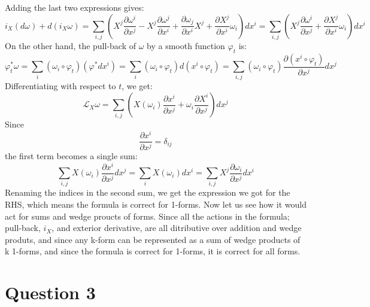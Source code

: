 \documentclass{article}
\begin{document}
Adding the last two expressions gives:
\begin{equation}
    i_X(d\omega) + d(i_X \omega) = \sum_{i,j}\left(X^j\frac{\partial \omega^i}{\partial x^j}
    - X^j\frac{\partial \omega^j}{\partial x^i} + \frac{\partial \omega_j}{\partial x^i}X^j + \frac{\partial X^j}{\partial x^i}\omega_i\right)dx^i = \sum_{i,j}\left(X^j\frac{\partial \omega^i}{\partial x^j}
    + \frac{\partial X^j}{\partial x^i}\omega_i\right)dx^i
\end{equation}
On the other hand, the pull-back of $\omega$ by a smooth function $\varphi_t$ is:
\begin{equation}
    \varphi_t^* \omega = \sum_i (\omega_i \circ \varphi_t) (\varphi^* dx^i) = 
    \sum_i (\omega_i \circ \varphi_t) d(x^i \circ \varphi_t) = 
    \sum_{i,j} (\omega_i \circ \varphi_t) \frac{\partial (x^i \circ \varphi_t)}{\partial x^j} dx^j
\end{equation}
Differentiating with respect to $t$, we get:
\begin{equation}
    \mathcal{L}_X \omega = \sum_{i,j} \left(
        X(\omega_i) \frac{\partial x^i}{\partial x^j}
        +
        \omega_i\frac{\partial X^i}{\partial x^j}
    \right) dx^j
\end{equation}
Since
\begin{equation}
    \frac{\partial x^i}{\partial x^j} = \delta_{ij}
\end{equation}
the first term becomes a single sum:
\begin{equation}
    \sum_{i,j} X(\omega_i) \frac{\partial x^i}{\partial x^j} dx^j = 
    \sum_{i} X(\omega_i) dx^i =
    \sum_{i,j} X^j \frac{\partial \omega_i}{\partial x^j} dx^i
\end{equation}
Renaming the indices in the second sum, we get the expression we got for the RHS, which means the formula is correct for 1-forms. Now let us see how it would act for sums and wedge proucts of forms. Since all the actions in the formula; pull-back, $i_X$, and exterior derivative, are all ditributive over addition and wedge produts, and since any k-form can be represented as a sum of wedge products of k 1-forms, and since the formula is correct for 1-forms, it is correct for all forms.

\section*{Question 3}
\end{document}
